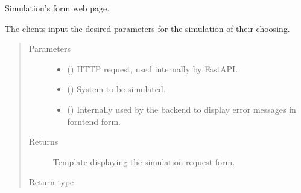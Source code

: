 \documentclass[a4paper,landscape,10pt,english]{sphinxmanual}
\begin{document}
\begin{fulllineitems}
\label{\detokenize{code_docs/simulation_API.controller:simulation_API.controller.main.simulate_sim_system}}
Simulation’s form web page.

The clients input the desired parameters for the simulation of their
choosing.
\begin{quote}\begin{description}
\item[{Parameters}] \leavevmode\begin{itemize}
\item {} 
 () \textendash{} HTTP request, used internally by FastAPI.

\item {} 
 ({\hyperref[\detokenize{code_docs/simulation_API.controller:simulation_API.controller.schemas.SimSystem}]{}}) \textendash{} System to be simulated.

\item {} 
 () \textendash{} Internally used by the backend to display error messages in forntend
form.

\end{itemize}

\item[{Returns}] \leavevmode
Template displaying the simulation request form.

\item[{Return type}] \leavevmode
{}

\end{description}\end{quote}

\end{fulllineitems}
\end{document}

